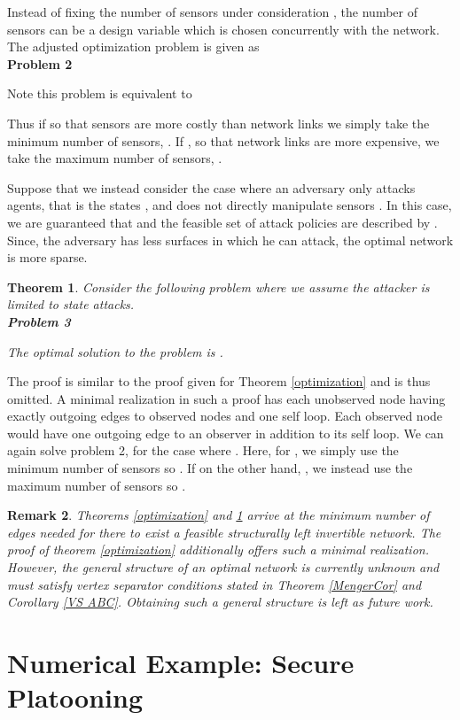 \documentclass[letterpaper, 10 pt, conference]{ieeeconf}
\newtheorem{theorem}{Theorem}
\newtheorem{remark}[theorem]{Remark}
\begin{document}
Instead of fixing the number of sensors under consideration , the number of sensors can be a design variable which is chosen concurrently with the network. The adjusted optimization problem is given as \\
\textbf{Problem 2}

Note this problem is equivalent to 

Thus if  so that sensors are more costly than network links we simply take the minimum number of sensors, . If , so that network links are more expensive, we take the maximum number of sensors, .

Suppose that we instead consider the case where an adversary only attacks agents, that is the states , and does not directly manipulate sensors . In this case, we are guaranteed that  and the feasible set of attack policies are described by . Since, the adversary has less surfaces in which he can attack, the optimal network is more sparse.
\begin{theorem}
Consider the following problem where we assume the attacker is limited to state attacks. \\
\textbf{Problem 3}

The optimal solution to the problem  is . \label{optimization2}
\end{theorem}

The proof is similar to the proof given for  Theorem \ref{optimization} and is thus omitted. A minimal realization in such a proof has each unobserved node having exactly  outgoing edges to observed nodes and one self loop. Each observed node would have one outgoing edge to an observer in addition to its self loop. We can again solve problem 2, for the case where . Here, for , we simply use the minimum number of sensors so . If on the other hand, , we instead use the maximum number of sensors so .
\begin{remark}
Theorems \ref{optimization} and \ref{optimization2} arrive at the minimum number of edges needed for there to exist a feasible structurally left invertible network. The proof of theorem \ref{optimization} additionally offers such a minimal realization. However, the general structure of an optimal network is currently unknown and must satisfy vertex separator conditions stated in Theorem \ref{MengerCor} and Corollary \ref{VS ABC}. Obtaining such a general structure is left as future work.
\end{remark}


\section{Numerical Example: Secure Platooning}\label{examples}
\end{document}
